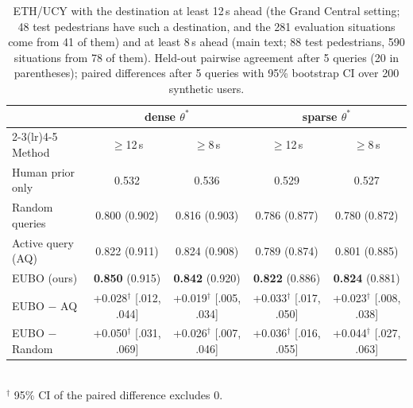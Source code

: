 \begin{table}[h]
\centering
\caption{ETH/UCY with the destination at least 12\,s ahead (the Grand Central setting; 48 test pedestrians have such a destination, and the 281 evaluation situations come from 41 of them) and at least 8\,s ahead (main text; 88 test pedestrians, 590 situations from 78 of them). Held-out pairwise agreement after 5 queries (20 in parentheses); paired differences after 5 queries with 95\% bootstrap CI over 200 synthetic users.}
\label{tab:eth_dest}
\setlength{\tabcolsep}{4pt}
\begin{tabular}{lcccc}
\toprule
 & \multicolumn{2}{c}{dense $\theta^*$} & \multicolumn{2}{c}{sparse $\theta^*$} \\
\cmidrule(lr){2-3}\cmidrule(lr){4-5}
Method & $\geq$12\,s & $\geq$8\,s & $\geq$12\,s & $\geq$8\,s \\
\midrule
Human prior only  & 0.532 & 0.536 & 0.529 & 0.527 \\
Random queries    & 0.800 \scriptsize{(0.902)} & 0.816 \scriptsize{(0.903)} & 0.786 \scriptsize{(0.877)} & 0.780 \scriptsize{(0.872)} \\
Active query (AQ) & 0.822 \scriptsize{(0.911)} & 0.824 \scriptsize{(0.908)} & 0.789 \scriptsize{(0.874)} & 0.801 \scriptsize{(0.885)} \\
EUBO (ours)       & \textbf{0.850} \scriptsize{(0.915)} & \textbf{0.842} \scriptsize{(0.920)} & \textbf{0.822} \scriptsize{(0.886)} & \textbf{0.824} \scriptsize{(0.881)} \\
\midrule
EUBO $-$ AQ       & +0.028$^\dagger$ \scriptsize{[.012, .044]} & +0.019$^\dagger$ \scriptsize{[.005, .034]} & +0.033$^\dagger$ \scriptsize{[.017, .050]} & +0.023$^\dagger$ \scriptsize{[.008, .038]} \\
EUBO $-$ Random   & +0.050$^\dagger$ \scriptsize{[.031, .069]} & +0.026$^\dagger$ \scriptsize{[.007, .046]} & +0.036$^\dagger$ \scriptsize{[.016, .055]} & +0.044$^\dagger$ \scriptsize{[.027, .063]} \\
\bottomrule
\end{tabular}
\\[2pt]{\scriptsize $^\dagger$ 95\% CI of the paired difference excludes 0.}
\end{table}

